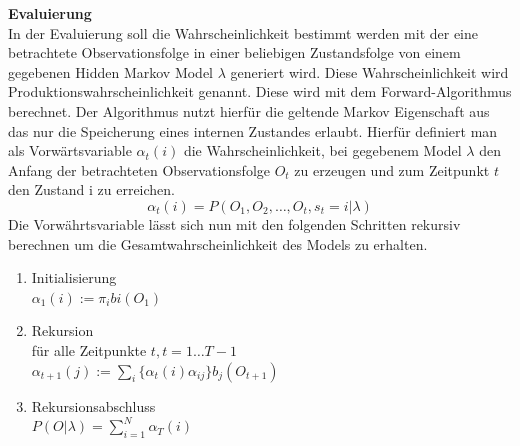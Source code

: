 \textbf{Evaluierung} \\
In der Evaluierung soll die Wahrscheinlichkeit bestimmt werden mit der eine
betrachtete Observationsfolge in einer beliebigen Zustandsfolge von einem
gegebenen Hidden Markov Model \(\lambda\) generiert wird. Diese Wahrscheinlichkeit wird
Produktionswahrscheinlichkeit genannt. Diese wird mit dem Forward-Algorithmus
berechnet. Der Algorithmus nutzt hierfür die geltende Markov Eigenschaft
aus das nur die Speicherung eines internen Zustandes erlaubt. Hierfür definiert
man als Vorwärtsvariable \(\alpha_{t}(i)\) die Wahrscheinlichkeit, bei
gegebenem Model $\lambda$ den Anfang der betrachteten Observationsfolge \(O_{t}\)
zu erzeugen und zum Zeitpunkt \(t\) den Zustand i zu erreichen.
\begin{equation}
\alpha_{t}(i) = P(O_{1},O_{2},\ldots,O_{t},s_{t}=i|\lambda)
\end{equation}
Die Vorwährtsvariable lässt sich nun mit den folgenden Schritten rekursiv
berechnen um die Gesamtwahrscheinlichkeit des Models zu erhalten.
\begin{enumerate}
  \item Initialisierung\\
		$\alpha_{1}(i) := \pi_{i}b{i}(O_{1})$
  \item Rekursion\\
	für alle Zeitpunkte \(t, t=1 \ldots T-1\)\\
	\(\alpha_{t+1}(j) :=
	\sum\limits_{i}\{\alpha_{t}(i)\alpha_{ij}\}b_{j}(O_{t+1})\)
  \item Rekursionsabschluss\\
  	\(P(O|\lambda) = \sum\limits_{i=1}^N \alpha_{T}(i)\)
\end{enumerate}


